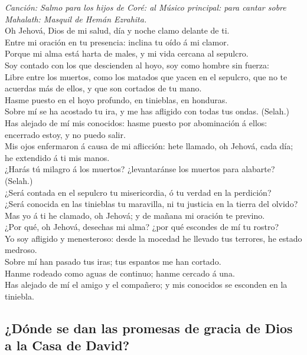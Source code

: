  \emph{Canción: Salmo para los hijos de Coré: al Músico
principal: para cantar sobre Mahalath: Masquil de Hemán Ezrahita.}\\
Oh Jehová, Dios de mi salud, día y noche clamo delante de ti.\\
 Entre mi oración en tu presencia: inclina tu oído á mi
clamor.\\
 Porque mi alma está harta de males, y mi vida cercana al
sepulcro.\\
 Soy contado con los que descienden al hoyo, soy como hombre
sin fuerza:\\
 Libre entre los muertos, como los matados que yacen en el
sepulcro, que no te acuerdas más de ellos, y que son cortados de tu
mano.\\
 Hasme puesto en el hoyo profundo, en tinieblas, en
honduras.\\
 Sobre mí se ha acostado tu ira, y me has afligido con todas
tus ondas. (Selah.)\\
 Has alejado de mí mis conocidos: hasme puesto por
abominación á ellos: encerrado estoy, y no puedo salir.\\
 Mis ojos enfermaron á causa de mi aflicción: hete llamado,
oh Jehová, cada día; he extendido á ti mis manos.\\
 ¿Harás tú milagro á los muertos? ¿levantaránse los muertos
para alabarte? (Selah.)\\
 ¿Será contada en el sepulcro tu misericordia, ó tu verdad
en la perdición?\\
 ¿Será conocida en las tinieblas tu maravilla, ni tu
justicia en la tierra del olvido?\\
 Mas yo á ti he clamado, oh Jehová; y de mañana mi oración
te previno.\\
 ¿Por qué, oh Jehová, desechas mi alma? ¿por qué escondes
de mí tu rostro?\\
 Yo soy afligido y menesteroso: desde la mocedad he llevado
tus terrores, he estado medroso.\\
 Sobre mí han pasado tus iras; tus espantos me han
cortado.\\
 Hanme rodeado como aguas de continuo; hanme cercado á
una.\\
 Has alejado de mí el amigo y el compañero; y mis conocidos
se esconden en la tiniebla.

\hypertarget{duxf3nde-se-dan-las-promesas-de-gracia-de-dios-a-la-casa-de-david}{%
\subsection{¿Dónde se dan las promesas de gracia de Dios a la Casa de
David?}\label{duxf3nde-se-dan-las-promesas-de-gracia-de-dios-a-la-casa-de-david}}

